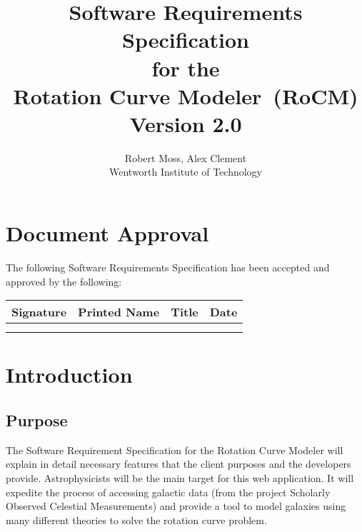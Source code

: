 \documentclass[titlepage]{article}
\def \RoCM {Rotation Curve Modeler}
\begin{document}
\title{
\textbf{
Software Requirements Specification}
\protect\\
for the
\protect\\
\textbf{
\RoCM\ (RoCM)}
\protect\\
{\small Version 2.0}}

\author{Robert Moss, Alex Clement
\protect\\
{\small Wentworth Institute of Technology}}
\maketitle

\section*{Document Approval}

The following Software Requirements Specification has been accepted and approved by the following:

\begin{center}
    \begin{tabularx}{\textwidth}{ |X|X|X|X| }
    \hline
    \textbf{Signature} & \textbf{Printed Name} & \textbf{Title} & \textbf{Date} \\ \hline
     &  &  &  \\ \hline
     &  &  &  \\ \hline
    \end{tabularx}
\end{center}

\newpage
\tableofcontents{} 
\newpage

\section{Introduction}

\subsection{Purpose}
The Software Requirement Specification for the Rotation Curve Modeler will explain in detail necessary features that the client purposes and the developers provide. Astrophysicists will be the main target for this web application. It will expedite the process of accessing galactic data (from the project Scholarly Observed Celestial Measurements) and provide a tool to model galaxies using many different theories to solve the rotation curve problem.
\end{document}
